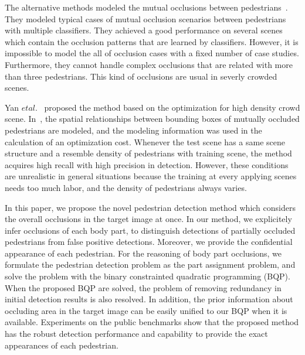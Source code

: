 \documentclass[10pt,twocolumn,letterpaper]{article}
\begin{document}
The alternative methods modeled the mutual occlusions between pedestrians~\cite{ouyang2013single, tang2013learning}.
They modeled typical cases of mutual occlusion scenarios between pedestrians with multiple classifiers.
They achieved a good performance on several scenes which contain the occlusion patterns that are learned by classifiers.
However, it is impossible to model the all of occlusion cases with a fixed number of case studies.
Furthermore, they cannot handle complex occlusions that are related with more than three pedestrians.
This kind of occlusions are usual in severly crowded scenes.

Yan $et al.$~\cite{yan2012multi} proposed the method based on the optimization for high density crowd scene.
In~\cite{yan2012multi}, the spatial relationships between bounding boxes of mutually occluded pedestrians are modeled, and the modeling information was used in the calculation of an optimization cost.
Whenever the test scene has a same scene structure and a resemble density of pedestrians with training scene, the method acquires high recall with high precision in detection.
However, these conditions are unrealistic in general situations because the training at every applying scenes needs too much labor, and the density of pedestrians always varies.

In this paper, we propose the novel pedestrian detection method which considers the overall occlusions in the target image at once.
In our method, we explicitely infer occlusions of each body part, to distinguish detections of partially occluded pedestrians from false positive detections.
Moreover, we provide the confidential appearance of each pedestrian.
For the reasoning of body part occlusions, we formulate the pedestrian detection problem as the part assignment problem, and solve the problem with the binary constrainted quadratic programming (BQP).
When the proposed BQP are solved, the problem of removing redundancy in initial detection results is also resolved.
In addition, the prior information about occluding area in the target image can be easily unified to our BQP when it is available.
Experiments on the public benchmarks show that the proposed method has the robust detection performance and capability to provide the exact appearances of each pedestrian.
\end{document}
